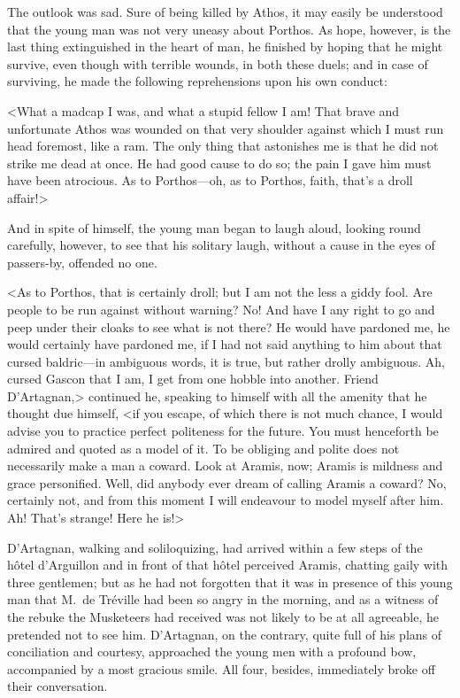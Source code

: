 The outlook was sad. Sure of being killed by Athos, it may easily be understood that the young man was not very uneasy about Porthos. As hope, however, is the last thing extinguished in the heart of man, he finished by hoping that he might survive, even though with terrible wounds, in both these duels; and in case of surviving, he made the following reprehensions upon his own conduct: 

<What a madcap I was, and what a stupid fellow I am! That brave and unfortunate Athos was wounded on that very shoulder against which I must run head foremost, like a ram. The only thing that astonishes me is that he did not strike me dead at once. He had good cause to do so; the pain I gave him must have been atrocious. As to Porthos—oh, as to Porthos, faith, that's a droll affair!> 

And in spite of himself, the young man began to laugh aloud, looking round carefully, however, to see that his solitary laugh, without a cause in the eyes of passers-by, offended no one. 

<As to Porthos, that is certainly droll; but I am not the less a giddy fool. Are people to be run against without warning? No! And have I any right to go and peep under their cloaks to see what is not there? He would have pardoned me, he would certainly have pardoned me, if I had not said anything to him about that cursed baldric—in ambiguous words, it is true, but rather drolly ambiguous. Ah, cursed Gascon that I am, I get from one hobble into another. Friend D'Artagnan,> continued he, speaking to himself with all the amenity that he thought due himself, <if you escape, of which there is not much chance, I would advise you to practice perfect politeness for the future. You must henceforth be admired and quoted as a model of it. To be obliging and polite does not necessarily make a man a coward. Look at Aramis, now; Aramis is mildness and grace personified. Well, did anybody ever dream of calling Aramis a coward? No, certainly not, and from this moment I will endeavour to model myself after him. Ah! That's strange! Here he is!> 

D'Artagnan, walking and soliloquizing, had arrived within a few steps of the hôtel d'Arguillon and in front of that hôtel perceived Aramis, chatting gaily with three gentlemen; but as he had not forgotten that it was in presence of this young man that M.~de Tréville had been so angry in the morning, and as a witness of the rebuke the Musketeers had received was not likely to be at all agreeable, he pretended not to see him. D'Artagnan, on the contrary, quite full of his plans of conciliation and courtesy, approached the young men with a profound bow, accompanied by a most gracious smile. All four, besides, immediately broke off their conversation. 

